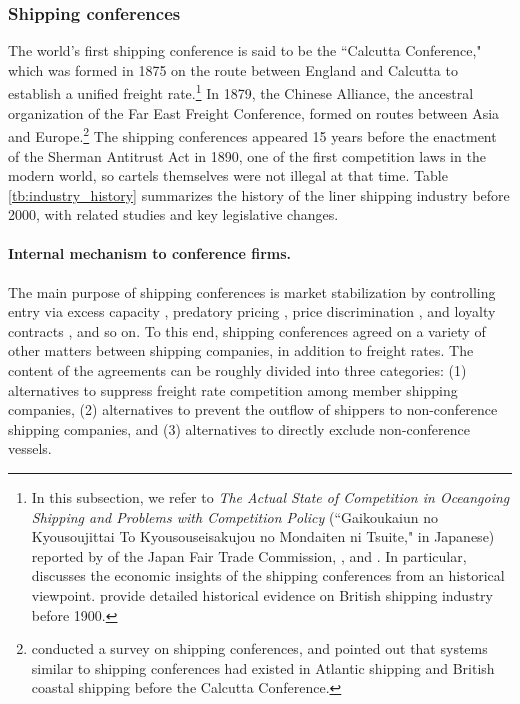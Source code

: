 \documentclass[11pt]{article}
\begin{document}
\subsubsection{Shipping conferences}\label{subsec:shipping_conference}
The world's first shipping conference is said to be the ``Calcutta Conference," which was formed in 1875 on the route between England and Calcutta to establish a unified freight rate.\footnote{In this subsection, we refer to \textit{The Actual State of Competition in Oceangoing Shipping and Problems with Competition Policy} (``Gaikoukaiun no Kyousoujittai To Kyousouseisakujou no Mondaiten ni Tsuite," in Japanese) reported by \cite{gaikoukaiun_no_kyousoujittai2006} of the Japan Fair Trade Commission,  \cite{branch2013maritime}, and \cite{sjostrom2013competition}. In particular, \cite{sjostrom1989collusion} discusses the economic insights of the shipping conferences from an historical viewpoint. \cite{morton1997entry} provide detailed historical evidence on British shipping industry before 1900.} In 1879, the Chinese Alliance, the ancestral organization of the Far East Freight Conference, formed on routes between Asia and Europe.\footnote{\cite{sjostrom2004ocean} conducted a survey on shipping conferences, and pointed out that systems similar to shipping conferences had existed in Atlantic shipping and British coastal shipping before the Calcutta Conference.} The shipping conferences appeared 15 years before the enactment of the Sherman Antitrust Act in 1890, one of the first competition laws in the modern world, so cartels themselves were not illegal at that time. Table \ref{tb:industry_history} summarizes the history of the liner shipping industry before 2000, with related studies and key legislative changes.

\paragraph{Internal mechanism to conference firms.}
The main purpose of shipping conferences is market stabilization by controlling entry via excess capacity \citep{fusillo2003excess}, predatory pricing \citep{morton1997entry,podolny1999social}, price discrimination \citep{fox1992empirical,clyde1998market}, and loyalty contracts \citep{marin2003exclusive}, and so on. To this end, shipping conferences agreed on a variety of other matters between shipping companies, in addition to freight rates. The content of the agreements can be roughly divided into three categories: (1) alternatives to suppress freight rate competition among member shipping companies, (2) alternatives to prevent the outflow of shippers to non-conference shipping companies, and (3) alternatives to directly exclude non-conference vessels.
\end{document}
